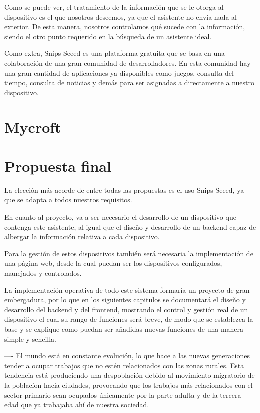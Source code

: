Como se puede ver, el tratamiento de la información que se le otorga al dispositivo es el que nosotros deseemos, ya que el asistente no envia nada al exterior. De esta manera, nosotros controlamos qué sucede con la información, siendo el otro punto requerido en la búsqueda de un asistente ideal.

Como extra, Snips Seeed es una plataforma gratuita que se basa en una colaboración de una gran comunidad de desarrolladores. En esta comunidad hay una gran cantidad de aplicaciones ya disponibles como juegos, consulta del tiempo, consulta de noticias y demás para ser asignadas a directamente a nuestro dispositivo.

\section{Mycroft}

\section{Propuesta final}

La elección más acorde de entre todas las propuestas es el uso Snips Seeed, ya que se adapta a todos nuestros requisitos.

En cuanto al proyecto, va a ser necesario el desarrollo de un dispositivo que contenga este asistente, al igual que el diseño y desarrollo de un backend capaz de albergar la información relativa a cada dispositivo.

Para la gestión de estos dispositivos también será necesaria la implementación de una página web, desde la cual puedan ser los dispositivos configurados, manejados y controlados.

La implementación operativa de todo este sistema formaría un proyecto de gran embergadura, por lo que en los siguientes capitulos se documentará el diseño y desarrollo del backend y del frontend, mostrando el control y gestión real de un dispositivo el cual su rango de funciones será breve, de modo que se establezca la base y se explique como puedan ser añadidas nuevas funciones de una manera simple y sencilla.



----
El mundo está en constante evolución, lo que hace a las nuevas generaciones tender a ocupar trabajos que no estén relacionados con las zonas rurales.
Esta tendencia está produciendo una despoblación debido al movimiento migratorio de la poblacíon hacia ciudades, provocando que los trabajos más relacionados con el sector primario sean ocupados únicamente por la parte adulta y de la tercera edad que ya trabajaba ahí de nuestra sociedad.

